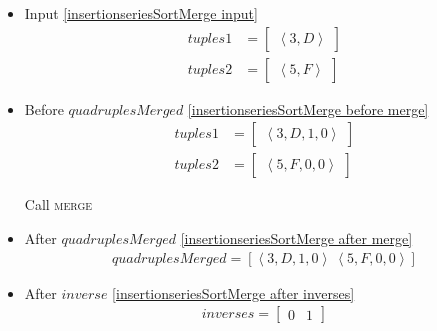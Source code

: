 \begin{frame}[containsverbatim]{\insertionseriesexampleframe}
\begin{columns}[c]
                \begin{column}{0.65\textwidth}
                    \vspace{-0.2cm}
                    \tiny
                    \begin{multicols}{2}
                        \begin{itemize}
                            \item Input \cref{insertionseriesSortMerge input}
                            \begin{align*}
                                tuples1 & = \begin{bmatrix}\left<3, D\right>\end{bmatrix} \\
                                tuples2 & = \begin{bmatrix}\left<5, F\right>\end{bmatrix}
                            \end{align*}
    
                            \item Before $quadruplesMerged$ \cref{insertionseriesSortMerge before merge}
                            \begin{align*}
                                tuples1 & = \begin{bmatrix}\left<3, D, 1, 0\right>\end{bmatrix} \\
                                tuples2 & = \begin{bmatrix}\left<5, F, 0, 0\right>\end{bmatrix}
                            \end{align*}

                            Call \textsc{merge}
    
                            \item After $quadruplesMerged$ \cref{insertionseriesSortMerge after merge}
                            \begin{align*}
                                quadruplesMerged = \left[\left<3, D, 1, 0\right> \ \left<5, F, 0, 0\right>\right]
                            \end{align*}
    
                            \item After $inverse$ \cref{insertionseriesSortMerge after inverses}
                            \begin{align*}
                                inverses = \begin{bmatrix}0 & 1\end{bmatrix}
                            \end{align*}
    

\end{itemize}
\end{multicols}
\end{column}
\end{columns}
\end{frame}
